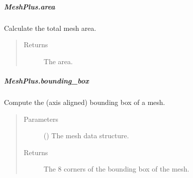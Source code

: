 \documentclass[letterpaper,10pt,english]{sphinxmanual}
\begin{document}
\begin{fulllineitems}
\begin{fulllineitems}
\end{fulllineitems}



\subparagraph{MeshPlus.area}
\label{\detokenize{api/generated/directional_clustering.mesh.MeshPlus.area:meshplus-area}}\label{\detokenize{api/generated/directional_clustering.mesh.MeshPlus.area::doc}}

\begin{fulllineitems}
\label{\detokenize{api/generated/directional_clustering.mesh.MeshPlus.area:directional_clustering.mesh.MeshPlus.area}}
Calculate the total mesh area.
\begin{quote}\begin{description}
\item[{Returns}] \leavevmode
{} \textendash{} The area.

\end{description}\end{quote}

\end{fulllineitems}



\subparagraph{MeshPlus.bounding\_box}
\label{\detokenize{api/generated/directional_clustering.mesh.MeshPlus.bounding_box:meshplus-bounding-box}}\label{\detokenize{api/generated/directional_clustering.mesh.MeshPlus.bounding_box::doc}}

\begin{fulllineitems}
\label{\detokenize{api/generated/directional_clustering.mesh.MeshPlus.bounding_box:directional_clustering.mesh.MeshPlus.bounding_box}}
Compute the (axis aligned) bounding box of a mesh.
\begin{quote}\begin{description}
\item[{Parameters}] \leavevmode
{} () \textendash{} The mesh data structure.

\item[{Returns}] \leavevmode
{} \textendash{} The 8 corners of the bounding box of the mesh.


\end{description}
\end{quote}
\end{fulllineitems}
\end{fulllineitems}
\end{document}
